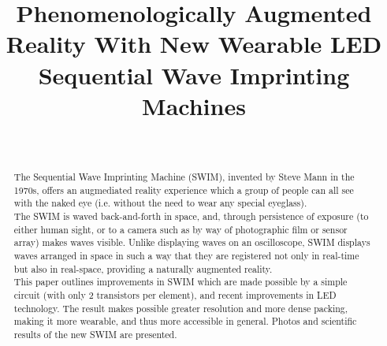 \documentclass[conference]{sig-alternate-05-2015}
\begin{document}
\title{Phenomenologically Augmented Reality With New Wearable LED Sequential Wave Imprinting Machines}

\author{
\\
}
\maketitle


\begin{abstract}

The Sequential Wave Imprinting Machine (SWIM), invented by Steve Mann in the 1970s, offers an augmediated reality experience which a group of people can all see with the naked eye (i.e. without the need to wear any special eyeglass).\\
The SWIM is waved back-and-forth in space, and, through persistence of exposure (to either human sight, or to a camera such as by way of photographic film or sensor array) makes waves visible.  Unlike displaying waves on an oscilloscope, SWIM displays waves arranged in space in such a way that they are registered not only in real-time but also in real-space, providing a naturally augmented reality. \\
This paper outlines improvements in SWIM which are made possible by a simple circuit (with only 2 transistors per element), and recent improvements in LED technology.  The result makes possible greater resolution and more dense packing, making it more wearable, and thus more accessible in general. Photos and scientific results of the new SWIM are presented.\\
\end{abstract}

%

\IEEEpeerreviewmaketitle
\end{document}
